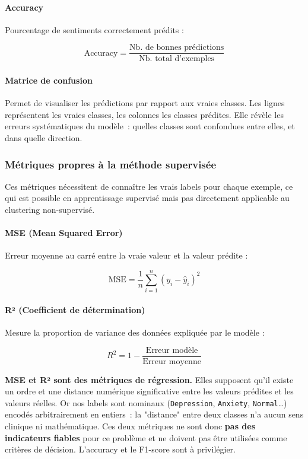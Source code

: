 \documentclass[12pt,a4paper]{report}
\begin{document}
\paragraph{Accuracy}

Pourcentage de sentiments correctement prédits :

\[
  \text{Accuracy} = \frac{\text{Nb. de bonnes prédictions}}{\text{Nb. total d'exemples}}
\]

\paragraph{Matrice de confusion}

Permet de visualiser les prédictions par rapport aux vraies classes. Les lignes représentent les vraies classes, les colonnes les classes prédites. Elle révèle les erreurs systématiques du modèle~: quelles classes sont confondues entre elles, et dans quelle direction.

\subsubsection{Métriques propres à la méthode supervisée}

Ces métriques nécessitent de connaître les vrais labels pour chaque exemple, ce qui est possible en apprentissage supervisé mais pas directement applicable au clustering non-supervisé.

\paragraph{MSE (Mean Squared Error)}

Erreur moyenne au carré entre la vraie valeur et la valeur prédite :

\[
  \text{MSE} = \frac{1}{n}\sum_{i=1}^{n}(y_i - \hat{y}_i)^2
\]

\paragraph{R² (Coefficient de détermination)}

Mesure la proportion de variance des données expliquée par le modèle :

\[
  R^2 = 1 - \frac{\text{Erreur modèle}}{\text{Erreur moyenne}}
\]

\begin{warn}[Attention]
\textbf{MSE et R² sont des métriques de régression.} Elles supposent qu'il existe un ordre et une distance numérique significative entre les valeurs prédites et les valeurs réelles. Or nos labels sont nominaux (\texttt{Depression}, \texttt{Anxiety}, \texttt{Normal}\ldots) encodés arbitrairement en entiers~: la "distance" entre deux classes n'a aucun sens clinique ni mathématique. Ces deux métriques ne sont donc \textbf{pas des indicateurs fiables} pour ce problème et ne doivent pas être utilisées comme critères de décision. L'accuracy et le F1-score sont à privilégier.
\end{warn}
\end{document}
